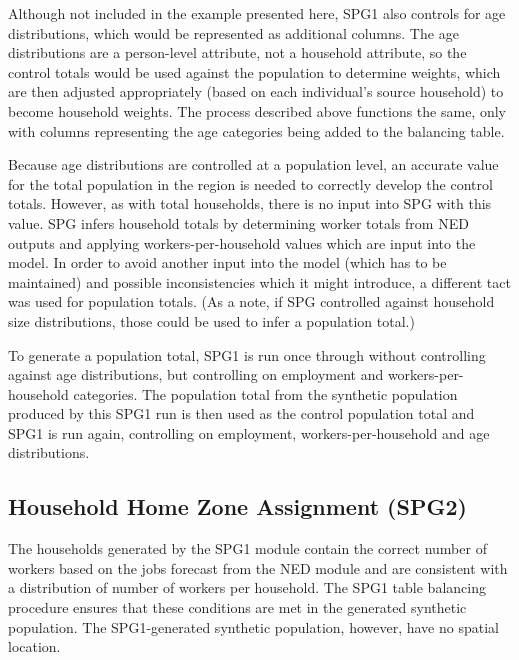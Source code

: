 Although not included in the example presented here, SPG1 also controls for age distributions, which would be represented as additional columns. The age distributions are a person-level attribute, not a household attribute, so the control totals would be used against the population to determine weights, which are then adjusted appropriately (based on each individual's source household) to become household weights. The process described above functions the same, only with columns representing the age categories being added to the balancing table.

Because age distributions are controlled at a population level, an accurate value for the total population in the region is needed to correctly develop the control totals. However, as with total households, there is no input into SPG with this value. SPG infers household totals by determining worker totals from NED outputs and applying workers-per-household values which are input into the model. In order to avoid another input into the model (which has to be maintained) and possible inconsistencies which it might introduce, a different tact was used for population totals. (As a note, if SPG controlled against household size distributions, those could be used to infer a population total.)

To generate a population total, SPG1 is run once through without controlling against age distributions, but controlling on employment and workers-per-household categories. The population total from the synthetic population produced by this SPG1 run is then used as the control population total and SPG1 is run again, controlling on employment, workers-per-household and age distributions.
  
\subsection{Household Home Zone Assignment (SPG2)}
The households generated by the SPG1 module contain the correct number of workers based on the jobs forecast from the NED module and are consistent with a distribution of number of workers per household. The SPG1 table balancing procedure ensures that these conditions are met in the generated synthetic population. The SPG1-generated synthetic population, however, have no spatial location.

